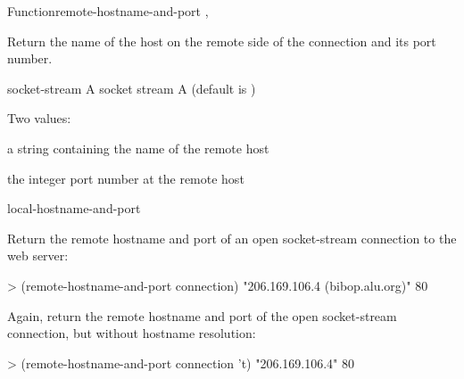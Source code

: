 \documentclass[10pt,twoside,english,pdftex]{article}
\begin{document}
\begin{functiondoc}{Function}{remote-hostname-and-port}%
  {   
  \returns{} , }
%
%
%
%

\fnsyntax

\fnpurpose Return the name of the host on the remote side of the
 connection and its port number.

\fnpackage {}

\fnmodule {}

\fnargs
\begin{args}{socket-stream}
 A socket stream
 A  (default is \nil)
\end{args}

\fnreturns Two values:
\begin{tightitemize}
\item a string containing the name of the remote host
\item the integer port number at the remote host
\end{tightitemize}

\begin{alsos}{local-hostname-and-port}
\end{alsos}

\fnexamples
Return the remote hostname and port of an open socket-stream
connection to the  web server:
\begin{example}
> (remote-hostname-and-port connection)
"206.169.106.4 (bibop.alu.org)"
80
\end{example}

Again, return the remote hostname and port of the open socket-stream
connection, but without hostname resolution:
\begin{example}
> (remote-hostname-and-port connection 't)
"206.169.106.4"
80
\end{example}

\end{functiondoc}

\end{document}
